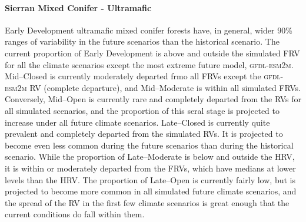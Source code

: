 \paragraph*{Sierran Mixed Conifer - Ultramafic} Early Development ultramafic mixed conifer forests have, in general, wider 90\% ranges of variability in the future scenarios than the historical scenario. The current proportion of Early Development is above and outside the simulated FRV for all the climate scenarios except the most extreme future model, \textsc{gfdl-esm2m}. Mid--Closed is currently moderately departed frmo all FRVs except the \textsc{gfdl-esm2m} RV (complete departure), and Mid--Moderate is within all simulated FRVs. Conversely, Mid--Open is currently rare and completely departed from the RVs for all simulated scenarios, and the proportion of this seral stage is projected to increase under all future climate scenarios. Late--Closed is currently quite prevalent and completely departed from the simulated RVs. It is projected to become even less common during the future scenarios than during the historical scenario. While the proportion of Late--Moderate is below and outside the HRV, it is within or moderately departed from the FRVs, which have medians at lower levels than the HRV. The proportion of Late--Open is currently fairly low, but is projected to become more common in all simulated future climate scenarios, and the spread of the RV in the first few climate scenarios is great enough that the current conditions do fall within them. 


